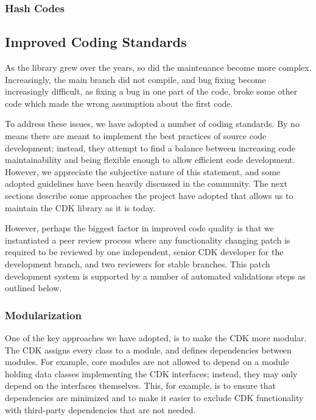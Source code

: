 \documentclass[10pt]{bmcart}
\begin{document}
\subsubsection*{Hash Codes}


\subsection*{Improved Coding Standards}

As the library grew over the years, so did the maintenance become more complex. Increasingly,
the main branch did not compile, and bug fixing become increasingly difficult, as fixing a bug
in one part of the code, broke some other code which made the wrong assumption about the first
code.

To address these issues, we have adopted a number of coding standards. By no means there are
meant to implement the best practices of source code development; instead, they attempt to find
a balance between increasing code maintainability and being flexible enough to allow efficient
code development. However, we appreciate the subjective nature of this statement, and some
adopted guidelines have been heavily discussed in the community.
The next sections describe some approaches the project have adopted that allows us to
maintain the CDK library as it is today. 

However, perhaps the biggest factor in improved code quality is that we
instantiated a peer review process where any functionality changing patch is
required to be reviewed by one independent, senior CDK developer for  the development
branch, and two reviewers for stable branches. This patch development system
is supported by a number of automated validations steps as outlined below.

  \subsubsection*{Modularization}
  
One of the key approaches we have adopted, is to make the CDK more modular. The CDK assigns
every class to a module, and defines dependencies between modules. For example, core modules
are not allowed to depend on a module holding data classes implementing the CDK interfaces;
instead, they may only depend on the interfaces themselves. This, for example, is to ensure
that dependencies are minimized and to make it easier to exclude CDK functionality with
third-party dependencies that are not needed.
\end{document}
